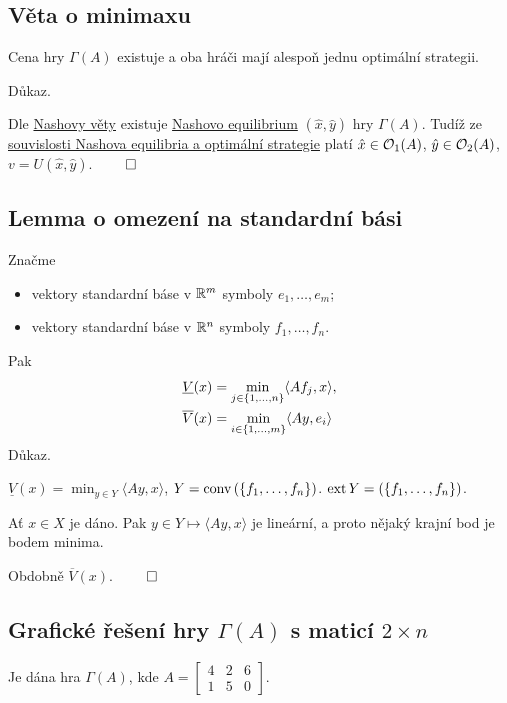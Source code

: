 \subsection{Věta o minimaxu}
Cena hry $\Gamma(A)$ existuje a oba hráči mají alespoň jednu optimální strategii.

Důkaz.

Dle \hyperref[nashV]{Nashovy věty} existuje \hyperref[nash]{Nashovo equilibrium} $(\hat x, \hat y)$ hry $\Gamma(A)$. 
Tudíž ze \hyperref[nashOpt]{souvislosti Nashova equilibria a optimální strategie} platí $\hat x \in \mathcal{O}_1(A)$, 
$\hat y \in \mathcal{O}_2(A)$, $v = U(\hat x, \hat y)$. $\qed$

\newpage
\subsection{Lemma o omezení na standardní bási}
Značme
\begin{itemize}
    \item vektory standardní báse v $\mathbb{R}^m$ symboly $e_1, \dots, e_m$;
    \item vektory standardní báse v $\mathbb{R}^n$ symboly $f_1, \dots, f_n$.
\end{itemize}
Pak
\begin{align*}
    \underline{V}(x) &= \min_{j\in\left\lbrace 1, \dots, n \right\rbrace}\langle Af_j, x\rangle, \\
    \overline{V}(x)  &= \min_{i\in\left\lbrace 1, \dots, m \right\rbrace}\langle Ay, e_i\rangle
\end{align*}
Důkaz.

$\underline{V}(x) = \min_{y \in Y}\langle Ay, x\rangle$, $Y = \operatorname*{conv} \left(\left\lbrace f_1, \dots, f_n \right\rbrace\right)$. 
$\operatorname*{ext} Y = \left(\left\lbrace f_1, \dots, f_n \right\rbrace\right)$.

Ať $x \in X$ je dáno. Pak $y \in Y \mapsto \langle Ay, x\rangle$ je lineární, a proto nějaký krajní bod je bodem minima.

Obdobně $\overline{V}(x)$. $\qed$

\subsection{Grafické řešení hry \texorpdfstring{$\Gamma(A)$}{Γ(A)} s maticí \texorpdfstring{$2 \times n$}{2 x n}}
Je dána hra $\Gamma(A)$, kde $A = 
\begin{bmatrix}
    4 & 2 & 6 \\
    1 & 5 & 0    
\end{bmatrix}$.
